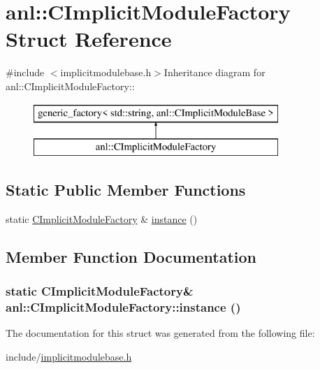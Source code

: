 \hypertarget{structanl_1_1CImplicitModuleFactory}{
\section{anl::CImplicitModuleFactory Struct Reference}
\label{structanl_1_1CImplicitModuleFactory}
}


{\ttfamily \#include $<$implicitmodulebase.h$>$}Inheritance diagram for anl::CImplicitModuleFactory::\begin{figure}[H]
\begin{center}
\leavevmode
\includegraphics[height=2cm]{structanl_1_1CImplicitModuleFactory}
\end{center}
\end{figure}
\subsection*{Static Public Member Functions}
\begin{DoxyCompactItemize}
\item 
static \hyperlink{structanl_1_1CImplicitModuleFactory}{CImplicitModuleFactory} \& \hyperlink{structanl_1_1CImplicitModuleFactory_a0ee63f8dd3d2e8fc53a25d1fd765f34a}{instance} ()
\end{DoxyCompactItemize}


\subsection{Member Function Documentation}
\hypertarget{structanl_1_1CImplicitModuleFactory_a0ee63f8dd3d2e8fc53a25d1fd765f34a}{
\subsubsection[{instance}]{\setlength{\rightskip}{0pt plus 5cm}static {\bf CImplicitModuleFactory}\& anl::CImplicitModuleFactory::instance ()}}
\label{structanl_1_1CImplicitModuleFactory_a0ee63f8dd3d2e8fc53a25d1fd765f34a}


The documentation for this struct was generated from the following file:\begin{DoxyCompactItemize}
\item 
include/\hyperlink{implicitmodulebase_8h}{implicitmodulebase.h}\end{DoxyCompactItemize}

